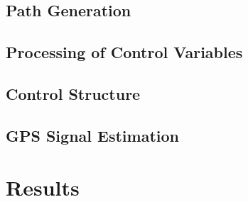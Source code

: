 \documentclass[11pt,a4paper]{scrartcl}		%
\begin{document}
\subsection{Path Generation}

\subsection{Processing of Control Variables}

\subsection{Control Structure}

\subsection{GPS Signal Estimation}

\section{Results}







\newpage
\end{document}
